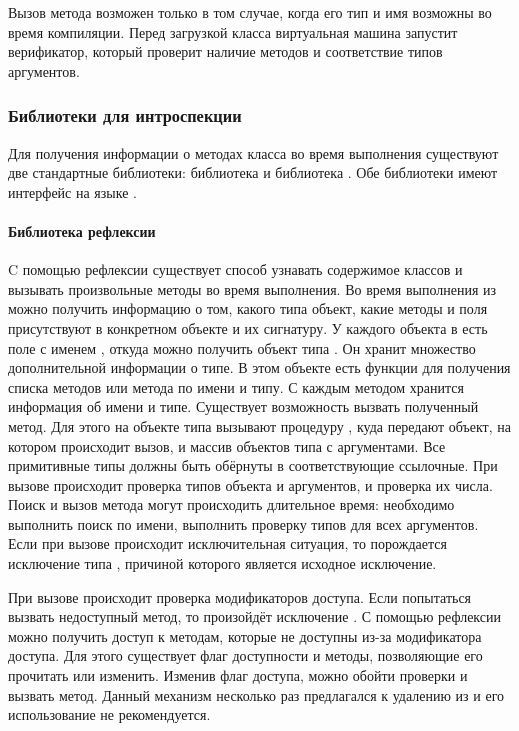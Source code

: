 Вызов метода возможен только в том случае, когда его тип и имя возможны во время компиляции. Перед загрузкой класса виртуальная машина запустит верификатор, который проверит наличие методов и соответствие типов аргументов.

\subsubsection{Библиотеки для интроспекции}
Для получения информации о методах класса во время выполнения существуют две стандартные библиотеки: библиотека  и библиотека . Обе библиотеки имеют интерфейс на языке .

\paragraph{Библиотека рефлексии}
C помощью рефлексии\cite{jvm:reflection} существует способ узнавать содержимое классов и вызывать произвольные методы во время выполнения. Во время выполнения из  можно получить информацию о том, какого типа объект, какие методы и поля присутствуют в конкретном объекте и их сигнатуру. У каждого объекта в  есть поле с именем , откуда можно получить объект типа . Он хранит множество дополнительной информации о типе. В этом объекте есть функции для получения списка методов или метода по имени и типу. С каждым методом хранится информация об имени и типе. Существует возможность вызвать полученный метод. Для этого на объекте типа  вызывают процедуру , куда передают объект, на котором происходит вызов, и массив объектов типа  с аргументами. Все примитивные типы должны быть обёрнуты в соответствующие ссылочные. При вызове происходит проверка типов объекта и аргументов, и проверка их числа. Поиск и вызов метода могут происходить длительное время: необходимо выполнить поиск по имени, выполнить проверку типов для всех аргументов. Если при вызове происходит исключительная ситуация, то порождается исключение типа , причиной которого является исходное исключение.

При вызове происходит проверка модификаторов доступа. Если попытаться вызвать недоступный метод, то произойдёт исключение . С помощью рефлексии можно получить доступ к методам, которые не доступны из-за модификатора доступа. Для этого существует флаг доступности и методы, позволяющие его прочитать или изменить. Изменив флаг доступа, можно обойти проверки и вызвать метод. Данный механизм несколько раз предлагался к удалению из  и его использование не рекомендуется.

